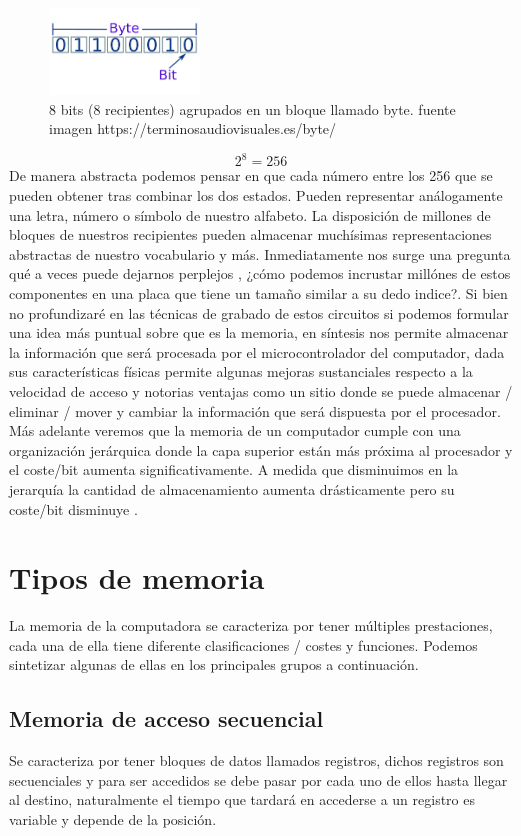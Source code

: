 \documentclass{article}
\begin{document}
\begin{figure}[h]
\includegraphics[width=4cm]{images/byte.png}
\centering
\caption{8 bits (8 recipientes)  agrupados en un bloque llamado byte. fuente imagen https://terminosaudiovisuales.es/byte/}
\label{fig:byte}
\end{figure}
\[2^{8}=256 \]
De manera abstracta podemos pensar en que cada número entre los 256 que se pueden obtener tras combinar los dos estados. Pueden representar 
 análogamente una letra, número o símbolo de nuestro alfabeto. La disposición de millones de bloques de nuestros recipientes pueden almacenar muchísimas representaciones abstractas de nuestro vocabulario y más.
Inmediatamente nos surge una pregunta qué a veces puede dejarnos perplejos , ¿cómo podemos incrustar millónes
 de estos componentes en una placa que tiene un tamaño similar a su dedo indice?. Si bien no profundizaré en las técnicas de grabado de estos circuitos si podemos formular una idea más puntual sobre que es la memoria, en síntesis nos permite almacenar la información que será procesada por el microcontrolador del computador, dada sus características físicas permite algunas mejoras sustanciales  
respecto a la velocidad de acceso y notorias ventajas como un sitio donde se puede almacenar / eliminar / mover y cambiar la información que será dispuesta por el procesador. Más adelante veremos que la memoria de un computador cumple con una organización jerárquica donde la capa superior están  
más próxima al procesador y el coste/bit aumenta significativamente. A medida que disminuimos en la jerarquía la cantidad de almacenamiento aumenta drásticamente pero su coste/bit disminuye
.\newline 

\section{Tipos de memoria}


La memoria de la computadora se caracteriza por tener múltiples prestaciones, cada una de ella tiene diferente clasificaciones / costes y funciones. Podemos sintetizar algunas de ellas en los principales grupos a continuación.\newline 

\subsection{Memoria de acceso secuencial}
Se caracteriza por tener bloques de datos llamados registros, dichos registros son secuenciales y para ser accedidos se debe pasar por cada uno de ellos hasta llegar al destino, naturalmente el tiempo que tardará en accederse a un registro es variable y depende de la posición.
\end{document}
